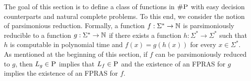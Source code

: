 \newcommand{\pP}{\textit{P}}
\newcommand{\pN}{\textit{N}}
\newcommand{\pV}{\textit{V}}
\newcommand{\pT}{\textit{T}}
\newcommand{\pA}{\textit{A}}
\newcommand{\pNC}{\textit{NC}}
\newcommand{\pD}{\textit{D}}

The goal of this section is to define a class of functions in $\text{\sc \#P}$ with easy decision counterparts and natural complete problems. To this end, we consider the notion of parsimonious reduction. Formally, a function $f : \Sigma^* \to \mathbb{N}$ is parsimoniously reducible to a function $g : \Sigma^* \to \mathbb{N}$ if there exists a function $h: \Sigma^* \to \Sigma^*$ such that $h$ is computable in polynomial time and $f(x) = g(h(x))$ for every $x \in \Sigma^*$. As mentioned at the beginning of this section, if $f$ can be parsimoniously reduced to $g$, then $L_g \in \text{\sc P}$ implies that $L_f \in \text{\sc P}$ and the existence of an FPRAS for $g$ implies the existence of an FPRAS for $f$. 

